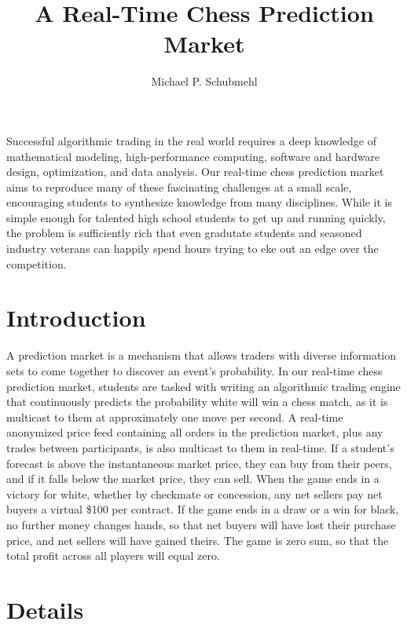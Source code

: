 \documentclass{article}
\begin{document}
\title{A Real-Time Chess Prediction Market}
\author{Michael P. Schubmehl}
\date{}

\maketitle

  
\abstract
{
Successful algorithmic trading in the real world requires a deep knowledge of mathematical modeling,
high-performance computing, software and hardware design, optimization, and data analysis. Our
real-time chess prediction market aims to reproduce many of these fascinating challenges at a small
scale, encouraging students to synthesize knowledge from many disciplines. While it is simple enough
for talented high school students to get up and running quickly, the problem is sufficiently rich
that even gradutate students and seasoned industry veterans can happily spend hours trying to eke
out an edge over the competition.
}
  

\section{Introduction}

A prediction market is a mechanism that allows traders with diverse information sets to come
together to discover an event's probability. In our real-time chess prediction market, students are
tasked with writing an algorithmic trading engine that continuously predicts the probability white
will win a chess match, as it is multicast to them at approximately one move per second. A real-time
anonymized price feed containing all orders in the prediction market, plus any trades between
participants, is also multicast to them in real-time. If a student's forecast is above the
instantaneous market price, they can buy from their peers, and if it falls below the market price,
they can sell. When the game ends in a victory for white, whether by checkmate or concession, any
net sellers pay net buyers a virtual \$100 per contract. If the game ends in a draw or a win for
black, no further money changes hands, so that net buyers will have lost their purchase price, and
net sellers will have gained theirs. The game is zero sum, so that the total profit across all
players will equal zero.





\section{Details}
\end{document}

